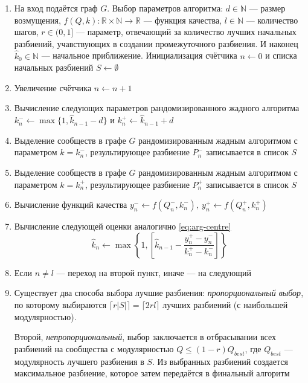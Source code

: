 \begin{enumerate}
	\item На вход подаётся граф $G$. Выбор параметров алгоритма: $d \in \mathbb{N}$ --- размер возмущения, $f(Q, k): \mathbb{R} \times \mathbb{N} \rightarrow \mathbb{R}$ --- функция качества, $l \in \mathbb{N}$ --- количество шагов, $r \in (0, 1]$ --- параметр, отвечающий за количество лучших начальных разбиений, учавствующих в создании промежуточного разбиения. И наконец $\hat{k}_0 \in \mathbb{N}$ --- начальное приближение. Инициализация счётчика $n \leftarrow 0$ и списка начальных разбиений $S \leftarrow \emptyset$
	\item Увеличение счётчика $n \leftarrow n + 1$
	\item \label{item:es-k+} Вычисление следующих параметров рандомизированного жадного алгоритма $k_n^{-} \leftarrow \max\{1, \hat{k}_{n - 1} - d\}$ и $k_n^{+} \leftarrow \hat{k}_{n - 1} + d$
	\item Выделение сообществ в графе $G$ рандомизированным жадным алгоритмом с параметром $k = k_n^{-}$, результирующее разбиение $P_n^{-}$ записывается в список $S$
	\item Выделение сообществ в графе $G$ рандомизированным жадным алгоритмом с параметром $k = k_n^{+}$, результирующее разбиение $P_n^{+}$ записывается в список $S$
	\item Вычисление функций качества $y_n^{-} \leftarrow f(Q_n^{-}, k_n^{-}),\ y_n^{+} \leftarrow f(Q_n^{+}, k_n^{+})$
	\item Вычисление следующей оценки аналогично \eqref{eq:arg-centre}
	\begin{equation}\label{eq:aes-centre}
		\hat{k}_n \leftarrow \max\left\{1, \left[\hat{k}_{n - 1} - \frac{y_n^{+} - y_n^{-}}{k_n^{+} - k_n^{-}}\right]\right\}
	\end{equation}
	\item Если $n \ne l$ --- переход на второй пункт, иначе --- на следующий
	\item Существует два способа выбора лучшие разбиения: \emph{пропорциональный выбор}, по которому выбираются $\lceil r|S| \rceil = \lceil 2rl \rceil$ лучших разбиений (с наибольшей модулярностью).

	Второй, \emph{непропорциональный}, выбор заключается в отбрасывании всех разбиений на сообщества с модулярностью $Q \le (1 - r)Q_{best}$, где $Q_{best}$ --- модулярность лучшего разбиения в $S$. Из выбранных разбиений создается максимальное разбиение, которое затем передаётся в финальный алгоритм
\end{enumerate}

